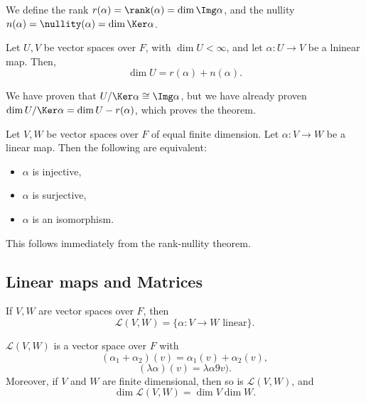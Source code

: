 \documentclass[12pt]{article}
\begin{document}
\begin{definition}
	We define the rank $r(\alpha) = \rank(\alpha) = \dim \Img \alpha$, and the nullity $n(\alpha) = \nullity(\alpha) = \dim \Ker \alpha$.
\end{definition}

\begin{theorem}
	Let $U, V$ be vector spaces over $F$, with $\dim U < \infty$, and let $\alpha : U \to V$ be a lninear map. Then,
	\[
		\dim U = r(\alpha) + n(\alpha)
	.\]
\end{theorem}

\begin{proofbox}
	We have proven that $U/\Ker \alpha \cong \Img \alpha$, but we have already proven $\dim U/\Ker \alpha = \dim U - r(\alpha)$, which proves the theorem.
\end{proofbox}

\begin{lemma}
	Let $V, W$ be vector spaces over $F$ of equal finite dimension. Let $\alpha : V \to W$ be a linear map. Then the following are equivalent:
	\begin{itemize}
		\item $\alpha$ is injective,
		\item $\alpha$ is surjective,
		\item $\alpha$ is an isomorphism.
	\end{itemize}
\end{lemma}

This follows immediately from the rank-nullity theorem.

\subsection{Linear maps and Matrices}%
\label{sub:linear_maps_and_matrices}

\begin{definition}
	If $V, W$ are vector spaces over $F$, then
	\[
		\mathcal{L}(V, W) = \{\alpha : V \to W \text{ linear}\}
	.\]
\end{definition}

\begin{proposition}
	$\mathcal{L}(V, W)$ is a vector space over $F$ with
	\[
		(\alpha_1 + \alpha_2)(v) = \alpha_1(v) + \alpha_2(v)
	,\]
	\[
		(\lambda \alpha)(v) = \lambda \alpha 9v)
	.\]
	Moreover, if $V$ and $W$ are finite dimensional, then so is $\mathcal{L}(V, W)$, and
	\[
		\dim \mathcal{L}(V, W) = \dim V \dim W
	.\]
\end{proposition}
\end{document}
